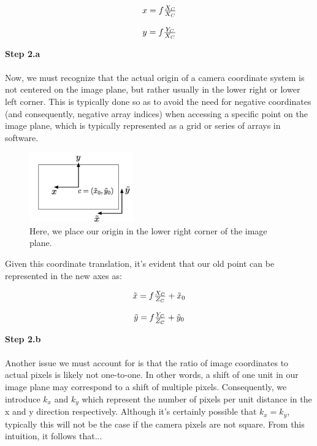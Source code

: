 \documentclass[]{article}
\begin{document}
\begin{center}
\begin{equation}
\begin{tabular}{c}
  $x = f\frac{X_C}{X_C}$\\
  \\
  $y = f\frac{Y_C}{X_C}$
\end{tabular}
\end{equation}
\end{center}

\textbf{Step 2.a}\\\\
Now, we must recognize that the actual origin of a camera coordinate system is not centered on the image plane, but rather usually in the lower right or lower left corner. This is typically done so as to avoid the need for negative coordinates (and consequently, negative array indices) when accessing a specific point on the image plane, which is typically represented as a grid or series of arrays in software.

\begin{figure}[H]
\includegraphics[width=0.4\textwidth]{vik_image_2.png}
\centering
\caption{Here, we place our origin in the lower right corner of the image plane. }
\label{fig:camera_coordinates}
\end{figure}

Given this coordinate translation, it's evident that our old point can be represented in the new axes as:

\begin{center}
\begin{equation}
\begin{tabular}{c}
  $\tilde{x} = f\frac{X_C}{Z_C} + \tilde{x}_0$\\
  \\
  $\tilde{y} = f\frac{Y_C}{Z_C} + \tilde{y}_0$
\end{tabular}
\end{equation}
\end{center}

\textbf{Step 2.b}\\\\
Another issue we must account for is that the ratio of image coordinates to actual pixels is likely not one-to-one. In other words, a shift of one unit in our image plane may correspond to a shift of multiple pixels. Consequently, we introduce $k_x$ and $k_y$ which represent the number of pixels per unit distance in the x and y direction respectively. Although it's certainly possible that $k_x = k_y$, typically this will not be the case if the camera pixels are not square. From this intuition, it follows that...
\end{document}
